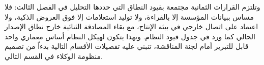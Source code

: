 وتلتزم القرارات الثمانية مجتمعة بقيود النطاق التي حددها التحليل في الفصل الثالث: فلا مساس ببيانات المؤسسة إلا بالقراءة، ولا توليد استعلامات إلا فوق العروض الذكية، ولا اعتماد على اتصال خارجي في بيئة الإنتاج، مع بقاء المصادقة الثنائية خارج نطاق الإصدار الحالي كما ورد في جدول قيود النظام. وبهذا يتكون لهيكل النظام أساس معماري واحد قابل للتبرير أمام لجنة المناقشة، تنبني عليه تفصيلات الأقسام التالية بدءاً من تصميم منظومة الوكلاء في القسم التالي.
